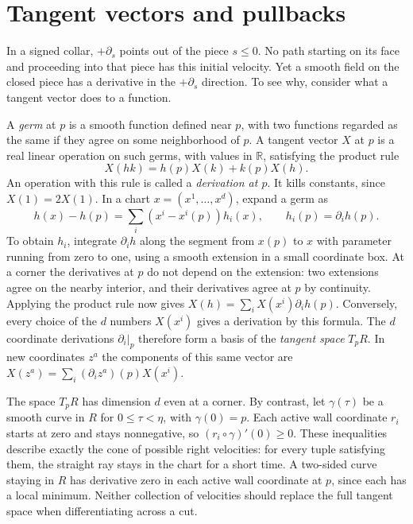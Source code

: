 \section{Tangent vectors and pullbacks}\label{D-tangent-maps}

In a signed collar, $+\partial_s$ points out of the piece $s\leq0$. No path starting on its face and proceeding into that piece has this initial velocity. Yet a smooth field on the closed piece has a derivative in the $+\partial_s$ direction. To see why, consider what a tangent vector does to a function.

A \emph{germ} at $p$ is a smooth function defined near $p$, with two functions regarded as the same if they agree on some neighborhood of $p$. A tangent vector $X$ at $p$ is a real linear operation on such germs, with values in $\mathbb R$, satisfying the product rule
\[
 X(hk)=h(p)X(k)+k(p)X(h).
\]
An operation with this rule is called a \emph{derivation at $p$}. It kills constants, since $X(1)=2X(1)$. In a chart $x=(x^1,\ldots,x^d)$, expand a germ as
\[
 h(x)-h(p)=\sum_i (x^i-x^i(p))h_i(x),\qquad h_i(p)=\partial_i h(p).
\]
To obtain $h_i$, integrate $\partial_i h$ along the segment from $x(p)$ to $x$ with parameter running from zero to one, using a smooth extension in a small coordinate box. At a corner the derivatives at $p$ do not depend on the extension: two extensions agree on the nearby interior, and their derivatives agree at $p$ by continuity. Applying the product rule now gives $X(h)=\sum_i X(x^i)\partial_i h(p)$. Conversely, every choice of the $d$ numbers $X(x^i)$ gives a derivation by this formula. The $d$ coordinate derivations $\partial_i|_p$ therefore form a basis of the \emph{tangent space} $T_p R$. In new coordinates $z^a$ the components of this same vector are $X(z^a)=\sum_i(\partial_i z^a)(p)X(x^i)$.

The space $T_p R$ has dimension $d$ even at a corner. By contrast, let $\gamma(\tau)$ be a smooth curve in $R$ for $0\leq\tau<\eta$, with $\gamma(0)=p$. Each active wall coordinate $r_i$ starts at zero and stays nonnegative, so $(r_i\circ\gamma)'(0)\geq0$. These inequalities describe exactly the cone of possible right velocities: for every tuple satisfying them, the straight ray stays in the chart for a short time. A two-sided curve staying in $R$ has derivative zero in each active wall coordinate at $p$, since each has a local minimum. Neither collection of velocities should replace the full tangent space when differentiating across a cut.

